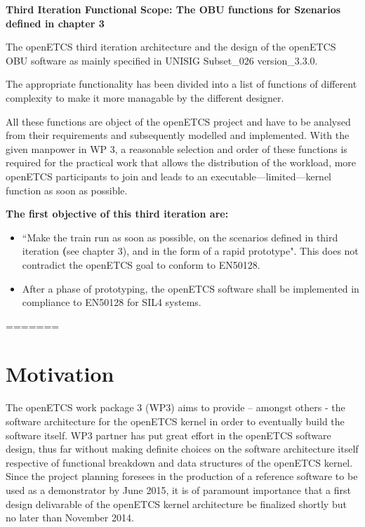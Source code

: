 \textbf{Third Iteration Functional Scope: The OBU functions for Szenarios defined in chapter 3}

The openETCS third iteration architecture and the design of the openETCS OBU software as mainly specified in \cite{subset-026} UNISIG Subset\_026 version\_3.3.0. 

The appropriate functionality has been divided into a list of functions of different complexity to make it more managable by the different designer.

All these functions are object of the openETCS project and have to be analysed from their requirements and subsequently modelled and implemented. With the given manpower in WP 3, a reasonable selection and order of these functions is required for the practical work that allows the distribution of the workload, more openETCS participants to join and leads to an executable---limited---kernel function as soon as possible. 


\textbf{The first objective of this third iteration are:}
\begin{itemize}
\item ``Make the train run as soon as possible, on the scenarios defined in third iteration \textbf(see chapter 3), and in the form of a rapid prototype".
This does not contradict the openETCS goal to conform to EN50128.
\item After a phase of prototyping, the openETCS software shall be implemented in compliance to EN50128 for SIL4 systems.
\end{itemize}


=======
%

\section{Motivation}
The openETCS work package 3 (WP3) aims to provide – amongst others - the software architecture for the openETCS kernel in order to eventually build the software itself. WP3  partner has put great effort in the openETCS software design, thus far without making definite choices on the software architecture itself respective of functional breakdown and data structures of the openETCS kernel. Since the project planning foresees in the production of a reference software to be used as a demonstrator by June 2015, it is of paramount importance that a first design delivarable of the openETCS kernel architecture be finalized shortly but no later than November 2014.\\


